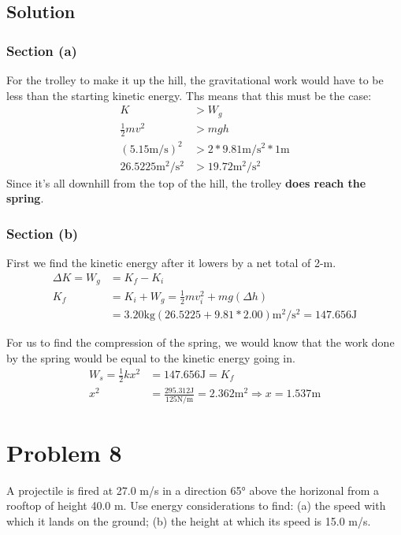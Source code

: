 \documentclass[12pt]{article}
\begin{document}
\subsection*{Solution}
\subsubsection*{Section (a)}
For the trolley to make it up the hill, the gravitational work would have to be less than the starting kinetic energy. Ths means that this must be the case: 
\begin{align*}
    K &> W_g \\ 
    \frac{1}{2}mv^2 &> mgh \\ 
    (5.15\unit{\meter/\second})^2 &> 2*9.81\unit{\meter/\second^2}*1\unit{\meter} \\
    26.5225\unit{\meter^2/\second^2} &> 19.72\unit{\meter^2/\second^2}
\end{align*}
Since it's all downhill from the top of the hill, the trolley \textbf{does reach the spring}.

\subsubsection*{Section (b)}
First we find the kinetic energy after it lowers by a net total of 2-m. 
\begin{align*}
    \Delta K = W_g &= K_f - K_i\\
    K_f &=  K_i + W_g
        =   \frac{1}{2}mv_i^2 + mg(\Delta h)\\
        &=  3.20\unit{\kilo\gram}(26.5225 + 9.81*2.00)\unit{\meter^2/\second^2} = 147.656\unit{\joule}
\end{align*}

For us to find the compression of the spring, we would know that the work done by the spring would be equal to the kinetic energy going in.
\begin{align*}
    W_s = \frac{1}{2}kx^2 &= 147.656\unit{\joule} = K_f\\
    x^2 &= \frac{295.312\unit{\joule}}{125\unit{\newton/\meter}} = 2.362\unit{\meter^2} \Rightarrow x = \boxed{1.537\unit{\meter}}
\end{align*}

\pagebreak
\section*{Problem 8}
A projectile is fired at 27.0 m/s in a direction 65\unit{\degree} above the horizonal from a rooftop of height 40.0 m. Use energy considerations to find: (a) the speed with which it lands on the ground; (b) the height at which its speed is 15.0 m/s.
\end{document}
